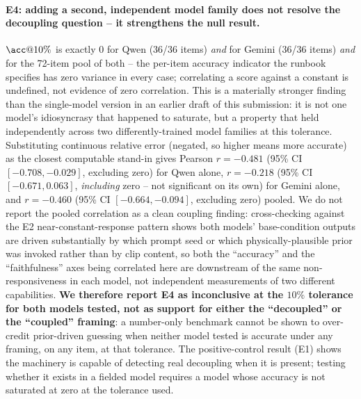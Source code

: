 \documentclass[11pt]{article}
\begin{document}
\paragraph{E4: adding a second, independent model family does not resolve the
decoupling question -- it strengthens the null result.} $\acc@10\%$ is exactly
0 for Qwen (36/36 items) \emph{and} for Gemini (36/36 items) \emph{and} for the
72-item pool of both -- the per-item accuracy indicator the runbook specifies
has zero variance in every case; correlating a score against a constant is
undefined, not evidence of zero correlation. This is a materially stronger
finding than the single-model version in an earlier draft of this submission:
it is not one model's idiosyncrasy that happened to saturate, but a property
that held independently across two differently-trained model families at this
tolerance. Substituting continuous relative error (negated, so higher means
more accurate) as the closest computable stand-in gives Pearson $r = -0.481$
(95\% CI $[-0.708, -0.029]$, excluding zero) for Qwen alone, $r = -0.218$
(95\% CI $[-0.671, 0.063]$, \emph{including} zero -- not significant on its
own) for Gemini alone, and $r = -0.460$ (95\% CI $[-0.664, -0.094]$, excluding
zero) pooled. We do not report the pooled correlation as a clean coupling
finding: cross-checking against the E2 near-constant-response pattern shows
both models' base-condition outputs are driven substantially by which prompt
seed or which physically-plausible prior was invoked rather than by clip
content, so both the ``accuracy'' and the ``faithfulness'' axes being
correlated here are downstream of the same non-responsiveness in each model,
not independent measurements of two different capabilities.
\textbf{We therefore report E4 as inconclusive at the $10\%$ tolerance for both
models tested, not as support for either the ``decoupled'' or the ``coupled''
framing}: a number-only benchmark cannot be shown to over-credit prior-driven
guessing when neither model tested is accurate under any framing, on any item,
at that tolerance. The positive-control result (E1) shows the machinery is
capable of detecting real decoupling when it is present; testing whether it
exists in a fielded model requires a model whose accuracy is not saturated at
zero at the tolerance used.
\end{document}
